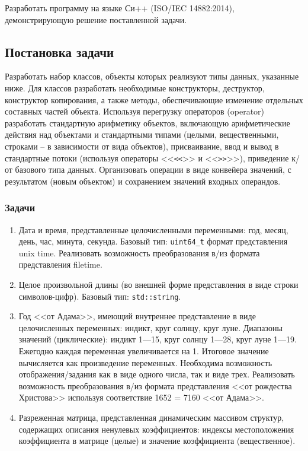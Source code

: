 \documentclass[a4paper,12pt]{article}
\begin{document}
Разработать программу на языке Си++ (ISO/IEC 14882:2014), демонстрирующую решение поставленной задачи.

\subsection*{Постановка задачи}

Разработать набор классов, объекты которых реализуют типы данных, указанные ниже.
Для классов разработать необходимые конструкторы, деструктор, конструктор копирования, а также методы, обеспечивающие изменение отдельных составных частей объекта.
Используя перегрузку операторов (operator) разработать стандартную арифметику объектов, включающую арифметические действия над объектами и стандартными типами (целыми, вещественными, строками – в зависимости от вида объектов), присваивание, ввод и вывод в стандартные потоки (используя операторы <<\verb!<<!>> и <<\verb!>>!>>), приведение к/от базового типа данных.
Организовать операции в виде конвейера значений, с результатом (новым объектом) и сохранением значений входных операндов.

\subsubsection*{Задачи}

\begin{enumerate}
	
\item
Дата и время, представленные целочисленными переменными: год, месяц, день, час, минута, секунда.
Базовый тип: \verb!uint64_t! формат представления unix time.
Реализовать возможность преобразования в/из формата представления filetime.

\item
Целое произвольной длины (во внешней форме представления в виде строки символов-цифр).
Базовый тип: \verb!std::string!.

\item
Год <<от Адама>>, имеющий внутреннее представление в виде целочисленных переменных: индикт, круг солнцу, круг луне.
Диапазоны значений (циклические): индикт 1—15, круг солнцу 1—28, круг луне 1—19.
Ежегодно каждая переменная увеличивается на 1.
Итоговое значение вычисляется как произведение переменных.
Необходима возможность отображения/задания как в виде одного числа, так и виде трех.
Реализовать возможность преобразования в/из формата представления <<от рождества Христова>> используя соответствие 1652 = 7160 <<от Адама>>.

\item Разреженная матрица, представленная динамическим массивом структур, содержащих описания ненулевых коэффициентов: индексы местоположения коэффициента в матрице (целые) и значение коэффициента (вещественное).
	
\end{enumerate}
\end{document}
